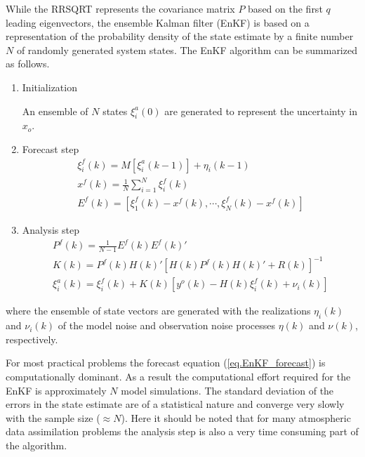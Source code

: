 While the RRSQRT represents the covariance matrix $P$ based on the first $q$
leading eigenvectors, the ensemble Kalman filter (EnKF) is based on a
representation of the probability density of the state estimate by a finite
number $N$ of randomly generated system states. The EnKF algorithm can be
summarized as follows.

\begin{enumerate}
\item Initialization

An ensemble of $N$ states $\xi^a_i(0)$ are generated to represent the
uncertainty in $x_o$.

\item Forecast step
  \begin{eqnarray}
    \xi_i^f(k)=M[\xi_i^a(k-1)] + \eta_i(k-1) \label{eq.EnKF_forecast} \\
    x^f(k)=\frac{1}{N} \sum_{i=1}^N \xi_i^f(k) \\
    E^f(k)=[\xi_1^f(k)-x^f(k),\cdots,\xi_N^f(k)-x^f(k)]
  \end{eqnarray}

\item Analysis step
  \begin{eqnarray}
    P^f(k)=\frac{1}{N-1}E^f(k)E^f(k)' \\
    K(k) = P^f(k)H(k)'[H(k)P^f(k)H(k)'+R(k)]^{-1} \\
    \xi^a_i(k) = \xi^f_i(k) + K(k) [y^o(k) - H(k) \xi^f_i(k) + \nu_i(k)]
  \end{eqnarray}
\end{enumerate}
where the ensemble of state vectors are generated with the realizations
$\eta_i(k)$ and $\nu_i(k)$ of the model noise and observation noise processes
$\eta(k)$ and $\nu(k)$, respectively.

For most practical problems the forecast equation (\ref{eq.EnKF_forecast}) is
computationally dominant. As a result the computational effort required for the
EnKF is approximately $N$ model simulations. The standard deviation of the
errors in the state estimate are of a statistical nature and converge very
slowly with the sample size ($\approx N$). Here it should be noted that for
many atmospheric data assimilation problems the analysis step is also a very
time consuming part of the algorithm.




